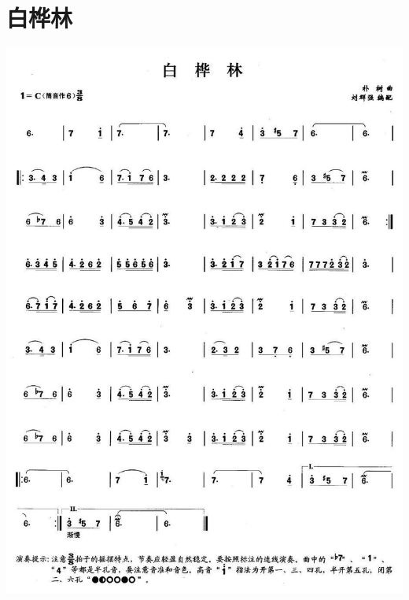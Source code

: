 \documentclass[cn,pad,chinese,chinesefont=nofont]{elegantbook}
\begin{document}
\section{白桦林}
    \includegraphics[width=\textwidth]{dongxiao/20200323白桦林.jpg}
\end{document}

